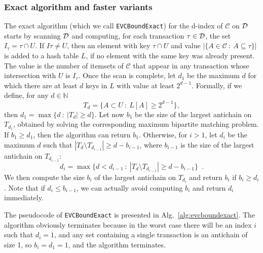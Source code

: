 \subsubsection{Exact algorithm and faster variants}
The exact algorithm (which we call \texttt{EVCBoundExact}) for the d-index of
$\mathcal{C}$ on ${\cal D}$ starts by scanning ${\cal D}$ and computing, for each
transaction $\tau\in{\cal D}$, the set $I_\tau=\tau\cap U$. If $I\tau\neq U$, then an
element with key $\tau\cap U$ and value $|\{A\in\mathcal{C} ~:~
A\subseteq\tau\}|$ is added to a hash table $L$, if no element with the same key
was already present. The value is the number of itemsets of $\mathcal{C}$ that
appear in any transaction whose intersection with $U$ is $I_\tau$. Once the scan
is complete, let $d_1$ be the maximum $d$ for which there are at least $d$ keys
in $L$ with value at least $2^{d-1}$. Formally, if we define, for any
$d\in\mathbb{N}$
\[
	T_d=\{A\subset U ~:~ L[A]\ge 2^{d-1}\},
\]
then $d_1=\max\{d ~:~ |T_d|\ge d\}$.
Let now $b_1$ be the size of the largest antichain on $T_{d_1}$, obtained by
solving the corresponding maximum bipartite matching problem. If $b_1\ge d_1$,
then the algorithm can return $b_1$. Otherwise, for $i>1$, let $d_i$ be the
maximum $d$ such that $|T_d\setminus T_{d_{i-1}}|\ge d-b_{i-1}$, where $b_{i-1}$
is the size of the largest antichain on $T_{d_{i-1}}$:
\[
	d_i=\max\{d<d_{i-1} ~:~ |T_d\setminus T_{d_{i-1}}|\ge d-b_{i-1}\}\enspace.
\]
We then compute the size $b_i$ of the largest antichain on $T_{d_i}$ and return
$b_i$ if $b_i\ge d_i$. Note that if $d_i\le b_{i-1}$, we can actually avoid
computing $b_i$ and return $d_i$ immediately.

The pseudocode of \texttt{EVCBoundExact} is presented in
Alg.~\ref{alg:evcboundexact}. The algorithm obviously terminates because in the
worst case there will be an index $i$ such that $d_i=1$, and any set containing
a single transaction is an antichain of size 1, so $b_i=d_1=1$, and the
algorithm terminates.

